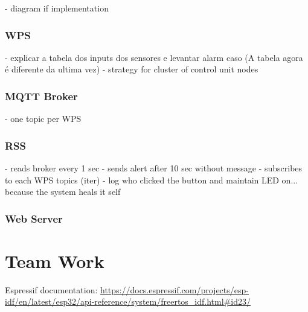 \documentclass[11pt]{article}
\begin{document}
- diagram if implementation

\subsubsection{WPS}

- explicar a tabela dos inputs dos sensores e levantar alarm caso (A tabela agora é diferente da ultima vez)
- strategy for cluster of control unit nodes

\subsubsection{MQTT Broker}

- one topic per WPS

\subsubsection{RSS}

- reads broker every 1 sec
- sends alert after 10 sec without message
- subscribes to each WPS topics (iter)
- log who clicked the button and maintain LED on... because the system heals it self 

\subsubsection{Web Server}

\section{Team Work}


\newpage
\begin{thebibliography}{8}

 Espressif documentation: {\url{https://docs.espressif.com/projects/esp-idf/en/latest/esp32/api-reference/system/freertos_idf.html#id23/}}

\end{thebibliography}
\end{document}
